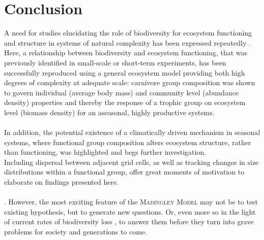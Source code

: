 \chapter{Conclusion}
A need for studies elucidating the role of biodiversity for ecosystem functioning and structure in systems of natural complexity has been expressed repeatedly \citep[e.g.][]{Hooper2012,Naeem2012,Tilman2014}.\\
Here, a relationship between biodiversity and ecosystem functioning, that was previously identified in small-scale or short-term experiments, has been successfully reproduced using a general ecosystem model providing both high degrees of complexity at adequate scale:
carnivore group composition was shown to govern individual (average body mass) and community level (abundance density)  properties and thereby the response of a trophic group on ecosystem level (biomass density) for an aseasonal, highly productive systems. \\\\
In addition, the potential existence of a climatically driven mechanism in seasonal systems, where functional group composition alters ecosystem structure, rather than functioning, 
was highlighted and begs further investigation.\\
Including dispersal between adjacent grid cells, as well as tracking changes in size distributions within a functional group, offer great moments of motivation to elaborate on findings presented here. 
\\\\
.
 However, the most exciting feature of the \textsc{Madingley Model} may not be to test existing hypothesis, but to generate new questions. Or, even more so in the light of current rates of biodiversity loss \citep{Ceballos2015, Urban2015}, to answer them before they turn into grave problems for society and generations to come. 
